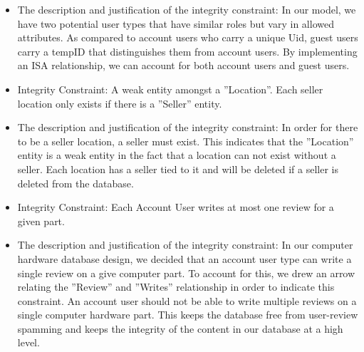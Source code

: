 {\begin{itemize}
\begin{itemize}
A covering constraint indicating that each user type must either be an ''Account User'' or a ''Guest User''
\item{ The description and justification of the integrity constraint: }
In our model, we have two potential user types that have similar roles but vary in allowed attributes. As compared to account users who carry a unique Uid, guest users carry a tempID that distinguishes them from account users. By implementing an ISA relationship, we can account for both account users and guest users.
\end{itemize}
\begin{itemize} 
\item{ Integrity Constraint: }
A weak entity amongst a ''Location''. Each seller location only exists if there is a ''Seller'' entity. 
\item{ The description and justification of the integrity constraint: }
In order for there to be a seller location, a seller must exist. This indicates that the ''Location'' entity is a weak entity in the fact that a location can not exist without a seller. Each location has a seller tied to it and will be deleted if a seller is deleted from the database.  
\end{itemize}
\begin{itemize} 
\item{ Integrity Constraint: }
Each Account User writes at most one review for a given part.
\item{ The description and justification of the integrity constraint: }
In our computer hardware database design, we decided that an account user type can write a single review on a give computer part. To account for this, we drew an arrow relating the ''Review'' and ''Writes'' relationship in order to indicate this constraint. An account user should not be able to write multiple reviews on a single computer hardware part. This keeps the database free from user-review spamming and keeps the integrity of the content in our database at a high level. 
\end{itemize}
\end{itemize}
}
